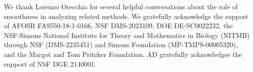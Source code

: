 \documentclass{article}
\begin{document}
We thank Lorenzo Orecchia for several helpful conversations about the role of smoothness in analyzing related methods. We gratefully acknowledge the support of AFOSR FA9550-18-1-0166, NSF DMS-2023109, DOE DE-SC0022232, the NSF-Simons National Institute for Theory and Mathematics in Biology (NITMB) through NSF (DMS-2235451) and Simons Foundation (MP-TMPS-00005320), and the Margot and Tom Pritzker Foundation. AD gratefully acknowledges the support of NSF DGE 2140001.



\newpage
\appendix













\vfill
\end{document}
